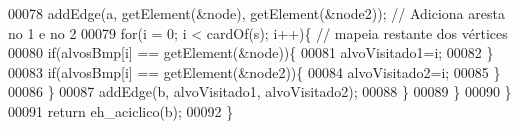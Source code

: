 \begin{DoxyCode}
00078                 addEdge(a, getElement(&node), getElement(&node2)); \textcolor{comment}{// Adiciona aresta no 1 e no 2}
00079                 \textcolor{keywordflow}{for}(i = 0; i < cardOf(s); i++)\{ \textcolor{comment}{// mapeia restante dos vértices}
00080                     \textcolor{keywordflow}{if}(alvosBmp[i] == getElement(&node))\{
00081                         alvoVisitado1=i;
00082                     \}
00083                     \textcolor{keywordflow}{if}(alvosBmp[i] == getElement(&node2))\{
00084                         alvoVisitado2=i;
00085                     \}
00086                 \}
00087                 addEdge(b, alvoVisitado1, alvoVisitado2);
00088             \}
00089         \}
00090     \}
00091     \textcolor{keywordflow}{return} eh_aciclico(b);
00092 \} 
\end{DoxyCode}

